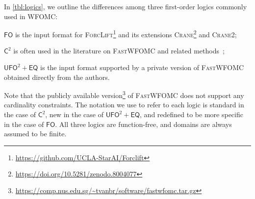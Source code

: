 \documentclass{article}
\theoremstyle{remark}
\newcommand{\cmark}{\ding{51}}
\newcommand{\xmark}{\ding{55}}
\newcommand{\Ctwo}{$\mathsf{C}^{2}$}
\newcommand{\FO}{$\mathsf{FO}$}
\newcommand{\UFO}{$\mathsf{UFO}^{2} + \mathsf{EQ}$}
\newcommand{\Cranetwo}{\textsc{Crane2}}
\begin{document}

In \cref{tbl:logics}, we outline the differences among three first-order logics
commonly used in WFOMC:
\begin{enumerate*}[label=(\roman*)]
  \item \FO{} is the input format for
  \textsc{ForcLift}\footnote{\url{https://github.com/UCLA-StarAI/Forclift}} and
  its extensions
  \textsc{Crane}\footnote{\url{https://doi.org/10.5281/zenodo.8004077}} and
  \Cranetwo{};
  \item \Ctwo{} is often used in the literature on \textsc{FastWFOMC} and
  related
  methods~\cite{DBLP:journals/jair/Kuzelka21,DBLP:conf/aaai/MalhotraS22};
  \item \UFO{} is the input format supported by a private version of
  \textsc{FastWFOMC} obtained directly from the authors.
\end{enumerate*}
Note that the publicly available
version\footnote{\url{https://comp.nus.edu.sg/~tvanbr/software/fastwfomc.tar.gz}}
of \textsc{FastWFOMC} does not support any cardinality constraints. The notation
we use to refer to each logic is standard in the case of \Ctwo{}, new in the
case of \UFO{}, and redefined to be more specific in the case of \FO{}. All
three logics are function-free, and domains are always assumed to be finite.
\end{document}
